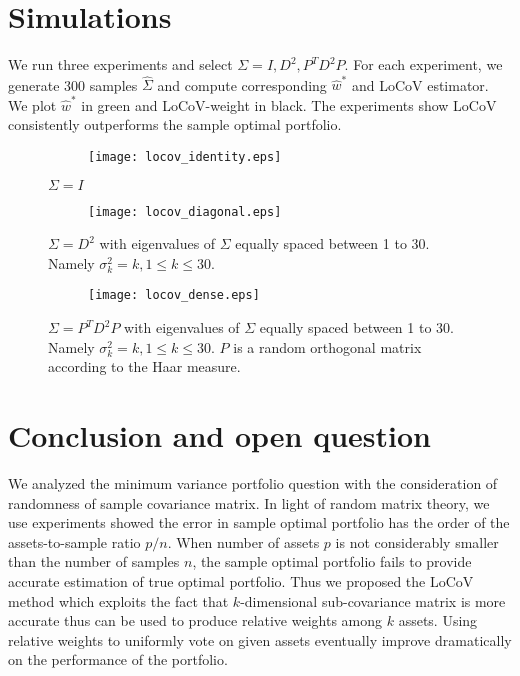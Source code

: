 \documentclass[12pt]{extarticle}
\newcommand{\1}{\mathbbm{1}}
\numberwithin{equation}{section}
\begin{document}


\section{Simulations}
We run three experiments and select $\Sigma= I, D^2, P^TD^2P$. For each experiment, we generate 300 samples $\hat{\Sigma}$ and compute  corresponding $\hat{w}^*$ and LoCoV estimator. We plot $\hat{w}^*$ in green and LoCoV-weight in black. The experiments show LoCoV consistently outperforms the sample optimal portfolio. 
\begin{figure}[H]
     \centering
     \begin{subfigure}[b]{0.9\textwidth}
         \centering
         \texttt{[image: locov\_identity.eps]}
     \end{subfigure} 
     \caption{$\Sigma=I$}
    \end{figure}%
\begin{figure}[H]
    \centering
     \begin{subfigure}[b]{0.9\textwidth}
         \centering
    \texttt{[image: locov\_diagonal.eps]}
     \end{subfigure}
     \caption{$\Sigma=D^2$ with  eigenvalues of $\Sigma$ equally spaced between 1 to 30. Namely $\sigma_k^2=k, 1\le k\le 30$.}
\end{figure}
\begin{figure}[H]
    \centering
     \begin{subfigure}[b]{0.9\textwidth}
         \centering
    \texttt{[image: locov\_dense.eps]}
     \end{subfigure}
     \caption{$\Sigma=P^TD^2P$ with  eigenvalues of $\Sigma$ equally spaced between 1 to 30. Namely $\sigma_k^2=k, 1\le k\le 30$. $P$ is a random orthogonal matrix according to the Haar measure.  }
     \label{fig:simulation}
\end{figure}





\section{Conclusion and open question}
We analyzed the minimum variance portfolio question with the consideration of randomness of sample covariance matrix. In light of random matrix theory, we use experiments showed the error in sample optimal portfolio has the order of the  assets-to-sample ratio $p/n$. When number of assets $p$ is not considerably smaller than the number of samples $n$, the sample optimal portfolio fails to provide accurate estimation of true optimal portfolio. Thus we proposed the LoCoV method which exploits the fact that $k$-dimensional sub-covariance matrix is more accurate thus can be used to produce relative weights among $k$ assets. Using relative weights to uniformly vote on given assets eventually improve dramatically on the performance of the portfolio.
\end{document}
